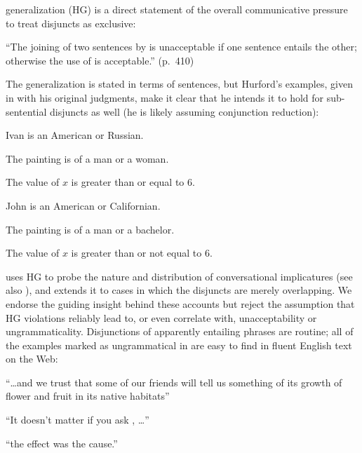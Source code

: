 \documentclass{article}
\begin{document}
 generalization (HG) is a direct statement of
the overall communicative pressure to treat disjuncts as exclusive:
%
\begin{examples}
\item\label{hg}%
  ``The joining of two sentences by  is unacceptable if one
  sentence entails the other; otherwise the use of  is
  acceptable.'' (p.~410)
\end{examples}
%
The generalization is stated in terms of sentences, but Hurford's
examples, given in  with his original judgments, make it clear
that he intends it to hold for sub-sentential disjuncts as well (he is
likely assuming conjunction reduction):
%
\begin{examples}
\item\label{hex}
  \begin{examples}
  \item Ivan is an American or Russian.
  \item The painting is of a man or a woman.
  \item The value of $x$ is greater than or equal to 6.
  \item\label{ex-bad1}\bad John is an American or Californian.
  \item\label{ex-bad2}\bad The painting is of a man or a bachelor.
  \item\label{ex-bad3}\bad The value of $x$ is greater than or not equal to 6.
  \end{examples}
\end{examples}

\citeauthor{Hurford:1974} uses HG to probe the nature and distribution
of conversational implicatures (see also
\citealt{Gazdar79b,ChierchiaFoxSpector08}), and \citet{Singh:2008}
extends it to cases in which the disjuncts are merely overlapping. We
endorse the guiding insight behind these accounts but reject the
assumption that HG violations reliably lead to, or even correlate
with, unacceptability or ungrammaticality. Disjunctions of apparently
entailing phrases are routine; all of the examples marked as
ungrammatical in  are easy to find in fluent English text on
the Web:
%
\begin{examples}
\item\label{hex-good}
  \begin{examples}
  \item ``\ldots and we trust that some of our 
    friends will tell us something of its growth of flower and fruit
    in its native habitats''
  \item ``It doesn't matter if you ask , \ldots''
  \item ``the effect was  the cause.''
  \end{examples}
\end{examples}
\end{document}
